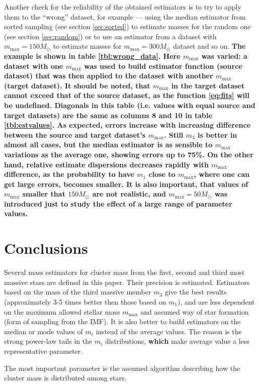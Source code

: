 \documentclass{aastex}
\newcommand{\MSun}{M_\odot}
\newcommand{\Mmax}{m_{\mathrm{max}}}
\begin{document}
Another check for the reliability of the obtained estimators is to try to apply them to the ``wrong'' dataset, for example --- using the median estimator from sorted sampling (see section \ref{sec:sorted}) to estimate masses for the random one (see section \ref{sec:random}) or to use an estimator from a dataset with $\Mmax = 150 \MSun$ to estimate masses for $\Mmax = 300 \MSun$ dataset and so on.
\textbf{The example is shown in table \ref{tbl:wrong_data}. Here $\Mmax$ was varied: a dataset with one $\Mmax$ was used to build estimator function (source dataset) that was then applied to the dataset with another $\Mmax$ (target dataset). It should be noted, that 
$\Mmax$ in the target dataset cannot exceed that of the source dataset, as the function \ref{eq:fits} will be undefined.
Diagonals in this table (i.e. values with equal source and target datasets) are the same as columns 8 and 10 in table \ref{tbl:estvalues}. As expected, errors increase with increasing difference between the source and target dataset's $\Mmax$.
Still $m_3$ is better in almost all cases, but the median estimator is as sensible to $\Mmax$ variations as the average one, showing
errors up to 75\%. On the other hand, relative estimate dispersions decreases rapidly with $\Mmax$ difference, as the probability to
have $m_1$ close to $\Mmax$, where one can get large errors, becomes smaller. It is also important, that values of $\Mmax$ smaller that $150 \MSun$ are not realistic, and $\Mmax = 50 \MSun$ was introduced just to study the effect of a large range of parameter values. }

\section{Conclusions}

Several mass estimators for cluster mass from the first, second and third most massive stars are defined in this paper. Their precision is estimated. Estimators based on the mass of the third massive member $m_3$ 
give the best results (approximately 3-5 times better then those based on $m_1$), and are less dependent on the maximum allowed stellar mass $\Mmax$ and assumed way of star formation (form of sampling from the IMF). 
It is also better to build estimators on the median or mode values of $m_i$ instead of the average values. The reason is the strong power-law tails in the  $m_i$ distributions, \textbf{which} make average value a less representative parameter.

The most important parameter is the assumed algorithm describing how the cluster mass is distributed among stars.
\end{document}
